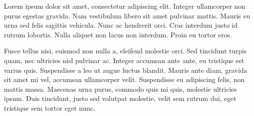 Lorem ipsum dolor sit amet, consectetur adipiscing elit. Integer
ullamcorper non purus egestas gravida. Nam vestibulum libero sit amet
pulvinar mattis. Mauris eu urna sed felis sagittis vehicula. Nunc ac
hendrerit orci. Cras interdum justo id rutrum lobortis. Nulla aliquet
non lacus non interdum. Proin eu tortor eros.

Fusce tellus nisi, euismod non nulla a, eleifend molestie orci. Sed
tincidunt turpis quam, nec ultricies nisl pulvinar ac. Integer
accumsan ante ante, eu tristique est varius quis. Suspendisse a leo ut
augue luctus blandit. Mauris ante diam, gravida sit amet mi vel,
accumsan ullamcorper velit. Suspendisse eu adipiscing felis, non
mattis massa. Maecenas urna purus, commodo quis mi quis, molestie
ultricies ipsum. Duis tincidunt, justo sed volutpat molestie, velit
sem rutrum dui, eget tristique sem tortor eget nunc.
